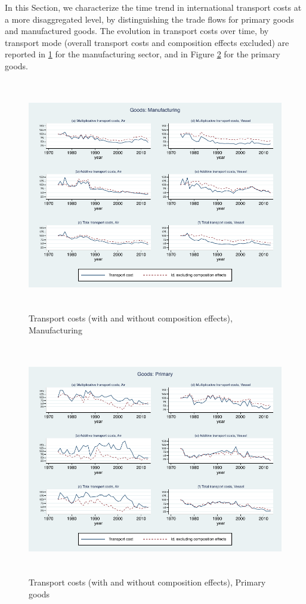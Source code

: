 \documentclass[11pt,twoside, authoryear]{elsarticle}
\begin{document}
In this Section, we characterize the time trend in international transport costs at a more disaggregated level, by distinguishing the trade flows for primary goods and manufactured goods. The evolution in transport costs over time, by transport mode (overall transport costs and composition effects excluded) are reported in \ref{fig:totalTC_compeffects_excl_manuf} for the manufacturing sector, and in Figure \ref{fig:totalTC_compeffects_excl_primary} for the primary goods.

\begin{figure}[htbp]
\caption{Transport costs (with and without composition effects), Manufacturing}
\label{fig:totalTC_compeffects_excl_manuf}
\begin{center}
\includegraphics[height=4in]
{graph_composition_manuf.pdf}
\end{center}
\end{figure}

\begin{figure}[htbp]
\caption{Transport costs (with and without composition effects), Primary goods}
\label{fig:totalTC_compeffects_excl_primary}
\begin{center}
\includegraphics[height=4in]
{graph_composition_primary.pdf}
\end{center}
\end{figure}
\end{document}
